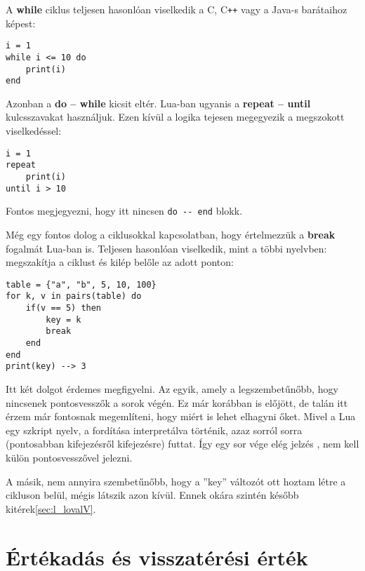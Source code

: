 A \textbf{while} ciklus teljesen hasonlóan viselkedik a C, C\verb|++| vagy a Java-s barátaihoz képest:
\scriptsize
\begin{lstlisting}
i = 1
while i <= 10 do
	print(i)
end
\end{lstlisting} 
\normalsize
Azonban a \textbf{do -- while} kicsit eltér. Lua-ban ugyanis a \textbf{repeat -- until} kulcsszavakat használjuk. Ezen kívül a logika tejesen megegyezik a megszokott viselkedéssel:
\scriptsize
\begin{lstlisting}
i = 1
repeat
	print(i)
until i > 10
\end{lstlisting} 
\normalsize
Fontos megjegyezni, hogy itt nincsen \verb|do -- end| blokk.

Még egy fontos dolog a ciklusokkal kapcsolatban, hogy értelmezzük a \textbf{break} fogalmát Lua-ban is. Teljesen hasonlóan viselkedik, mint a többi nyelvben: megszakítja a ciklust és kilép belőle az adott ponton:
\scriptsize
\begin{lstlisting}
table = {"a", "b", 5, 10, 100}
for k, v in pairs(table) do
	if(v == 5) then
		key = k
		break
	end
end
print(key) --> 3
\end{lstlisting}
\normalsize
Itt két dolgot érdemes megfigyelni. Az egyik, amely a legszembetűnőbb, hogy nincsenek pontosvesszők a sorok végén. Ez már korábban is előjött, de talán itt érzem már fontosnak megemlíteni, hogy miért is lehet elhagyni őket. Mivel a Lua egy szkript nyelv, a fordítása interpretálva történik, azaz sorról sorra (pontosabban kifejezésről kifejezésre) futtat. Így egy sor vége elég jelzés , nem kell külön pontosvesszővel jelezni.

A másik, nem annyira szembetűnőbb, hogy a ''key'' változót ott hoztam létre a cikluson belül, mégis látszik azon kívül. Ennek okára szintén később kitérek\ref{sec:l_lovalV}.


\section{Értékadás és visszatérési érték}
\label{sec:l_assign}

